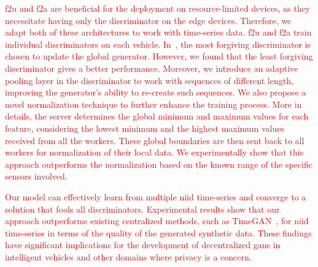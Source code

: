 \textcolor{red}{
\gls*{f2u} and \gls*{f2a} are beneficial for the deployment on resource-limited devices, as they necessitate having only the discriminator on the edge devices. Therefore, we adapt both of these architectures to work with time-series data. \gls*{f2u} and \gls*{f2a} train individual discriminators on each vehicle. In~\cite{yonetani_decentralized_2019}, the most forgiving discriminator is chosen to update the global generator. However, we found that the least forgiving discriminator gives a better performance. Moreover, we introduce an adaptive pooling layer in the discriminator to work with sequences of different  length, improving the generator's ability to re-create such sequences.
%
We also propose a novel normalization technique to further enhance the training process. More in details, the server determines the global minimum and maximum values for each feature, considering the lowest minimum and the highest maximum values received from all the workers. These global boundaries are then sent back to all workers for normalization of their local data. We experimentally show that this approach outperforms the normalization based on the known range of the specific sensors involved.}

\textcolor{red}{
Our model can effectively learn from multiple \gls*{niid} time-series and converge to a solution that fools all discriminators. Experimental results show that our approach outperforms existing centralized methods, such as TimeGAN~\cite{yoon_time-series_2019}, for \gls*{niid} time-series in terms of the quality of the generated synthetic data. These findings have significant implications for the development of decentralized \glspl*{gan} in intelligent vehicles and other domains where privacy is a concern.}

